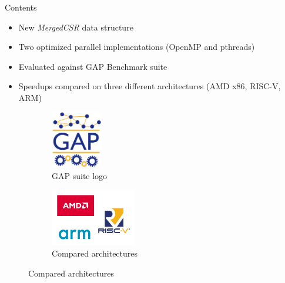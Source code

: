 \begin{frame}{Contents}
\begin{itemize}
    \item New \textit{MergedCSR} data structure
    \item Two optimized parallel implementations (OpenMP and pthreads)
    \pause
    \item Evaluated against GAP Benchmark suite
    \item Speedups compared on three different architectures (AMD x86, RISC-V, ARM)
\end{itemize}
\begin{figure}
    \centering
    \begin{subfigure}[c]{0.4\textwidth}
    \centering
        \includegraphics[height=2.5cm]{images/gapbs.png}
        \caption{GAP suite logo}
    \end{subfigure}
    \begin{subfigure}[c]{0.4\textwidth}
        \centering
        \includegraphics[height=2.5cm]{images/architectures.png}
        \caption{Compared architectures}
    \end{subfigure}
\end{figure}
\end{frame}